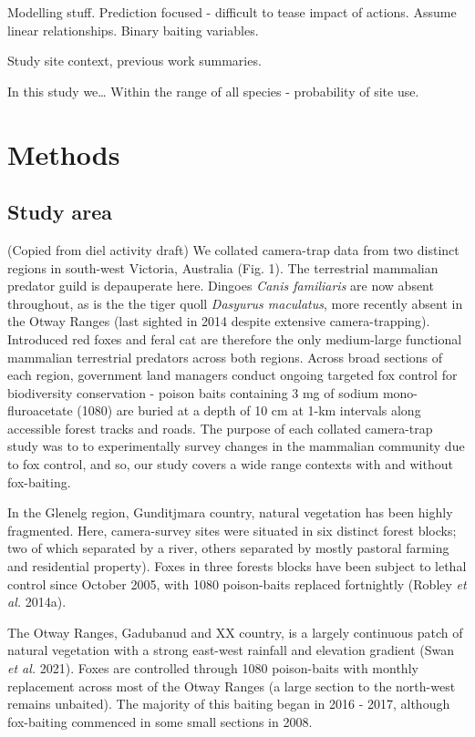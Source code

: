 \documentclass[11pt,a4paper,titlepage,twoside,openright]{style/unimelbthesis}
\begin{document}
\begin{mainmatter}
Modelling stuff. Prediction focused - difficult to tease impact of actions. Assume linear relationships.
Binary baiting variables.

Study site context, previous work summaries.

In this study we\ldots{}
Within the range of all species - probability of site use.

\hypertarget{methods}{%
\section{Methods}\label{methods}}

\hypertarget{study-area}{%
\subsection{Study area}\label{study-area}}

(Copied from diel activity draft)
We collated camera-trap data from two distinct regions in south-west Victoria, Australia (Fig. 1). The terrestrial mammalian predator guild is depauperate here. Dingoes \emph{Canis familiaris} are now absent throughout, as is the the tiger quoll \emph{Dasyurus maculatus}, more recently absent in the Otway Ranges (last sighted in 2014 despite extensive camera-trapping). Introduced red foxes and feral cat are therefore the only medium-large functional mammalian terrestrial predators across both regions. Across broad sections of each region, government land managers conduct ongoing targeted fox control for biodiversity conservation - poison baits containing 3 mg of sodium mono-fluroacetate (1080) are buried at a depth of 10 cm at 1-km intervals along accessible forest tracks and roads. The purpose of each collated camera-trap study was to to experimentally survey changes in the mammalian community due to fox control, and so, our study covers a wide range contexts with and without fox-baiting.

In the Glenelg region, Gunditjmara country, natural vegetation has been highly fragmented. Here, camera-survey sites were situated in six distinct forest blocks; two of which separated by a river, others separated by mostly pastoral farming and residential property). Foxes in three forests blocks have been subject to lethal control since October 2005, with 1080 poison-baits replaced fortnightly (Robley \emph{et al.} 2014a).

The Otway Ranges, Gadubanud and XX country, is a largely continuous patch of natural vegetation with a strong east-west rainfall and elevation gradient (Swan \emph{et al.} 2021). Foxes are controlled through 1080 poison-baits with monthly replacement across most of the Otway Ranges (a large section to the north-west remains unbaited). The majority of this baiting began in 2016 - 2017, although fox-baiting commenced in some small sections in 2008.


\end{mainmatter}
\end{document}
